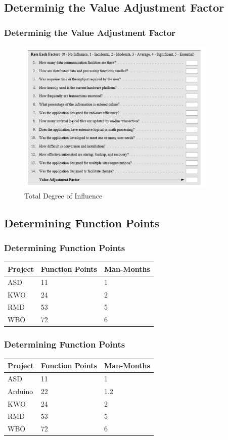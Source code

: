 \documentclass{beamer}
\begin{document}
\subsection{Determinig the Value Adjustment Factor}
\frame
{
	\frametitle{Determinig the Value Adjustment Factor}	
	\begin{figure}[h!]
  		\centering
    	\includegraphics[width=0.85\textwidth]{../Images/FP_2.png}
		\caption{Total Degree of Influence}
	\end{figure}
}

\subsection{Determining Function Points}
\frame
{
	\frametitle{Determining Function Points}
	\begin{tabular}{|l|l|l|}
	\hline
	Project & Function Points 	& Man-Months 	\\ \hline
	ASD 	& 11 				& 1				\\ \hline
	KWO 	& 24 				& 2				\\ \hline
	RMD 	& 53 				& 5				\\ \hline
	WBO 	& 72 				& 6				\\ \hline
	\end{tabular}
}

\frame
{
	\frametitle{Determining Function Points}
	\begin{tabular}{|l|l|l|}
	\hline
	Project & Function Points 	& Man-Months 	\\ \hline
	ASD 	& 11 				& 1				\\ \hline
	Arduino	& 22				& 1.2			\\ \hline
	KWO 	& 24 				& 2				\\ \hline
	RMD 	& 53 				& 5				\\ \hline
	WBO 	& 72 				& 6				\\ \hline
	\end{tabular}
}
\end{document}
